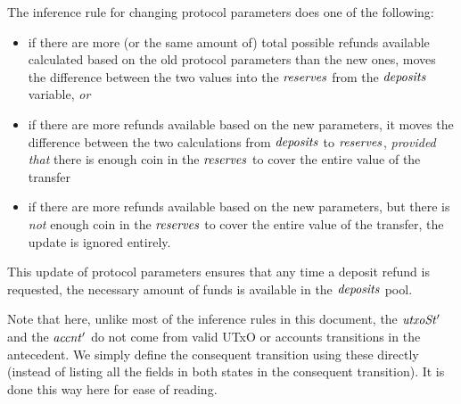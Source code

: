 The inference rule for changing protocol parameters does one of the following:

\begin{itemize}
\item if there are more (or the same amount of) total possible refunds
available calculated based on the old protocol parameters than the new ones,
moves the difference between the two values into the $\mathit{reserves}$
from the $\mathit{deposits}$ variable, \textit{or}

\item if there are more refunds available based on the new parameters, it moves
the difference between the two calculations from $\mathit{deposits}$
to $\mathit{reserves}$, \textit{provided that} there is enough coin in the
$\mathit{reserves}$ to cover the entire value of the transfer

\item if there are more refunds available based on the new parameters,
but there is \textit{not} enough coin in the $\mathit{reserves}$ to cover
the entire value of the transfer, the update is ignored entirely.
\end{itemize}

This update of protocol parameters ensures that any time a deposit refund is
requested, the necessary amount of funds is available in the $\mathit{deposits}$
pool.

Note that here, unlike most of the inference rules in this document,
the $\mathit{utxoSt'}$ and the $\mathit{accnt'}$ do not come from valid UTxO or
accounts transitions in the antecedent. We simply define the consequent
transition using these directly (instead of listing all the fields in both
states in the consequent transition). It is done this way here
for ease of reading.

